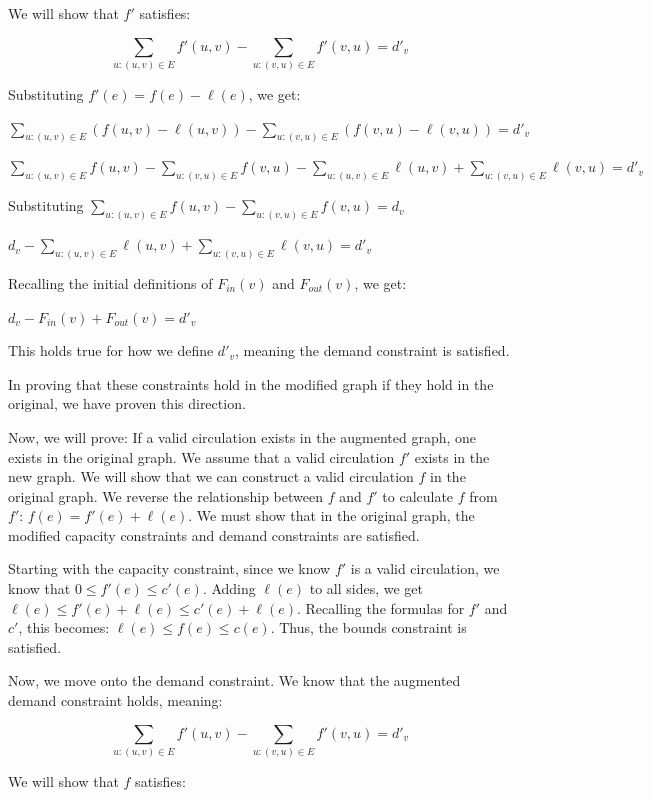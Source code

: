 \documentclass[11pt]{article}
\begin{document}
\begin{enumerate}
We will show that $f'$ satisfies:

$$\sum_{u: (u, v) \in E} f'(u, v) - \sum_{u: (v, u) \in E} f'(v, u) = d'_v$$

Substituting $f'(e) = f(e) - \ell(e)$, we get:

$\sum_{u: (u, v) \in E} (f(u, v) - \ell(u, v)) - \sum_{u: (v, u) \in E} (f(v, u) - \ell(v, u)) = d'_v$

$\sum_{u: (u, v) \in E} f(u, v) - \sum_{u: (v, u) \in E} f(v, u) - \sum_{u: (u, v) \in E} \ell(u, v) + \sum_{u: (v, u) \in E} \ell(v, u) = d'_v$

Substituting $\sum_{u: (u, v) \in E} f(u, v) - \sum_{u: (v, u) \in E} f(v, u) = d_v$

$d_v - \sum_{u: (u, v) \in E} \ell(u, v) + \sum_{u: (v, u) \in E} \ell(v, u) = d'_v$

Recalling the initial definitions of $F_{in}(v)$ and $F_{out}(v)$, we get:

$d_v - F_{in}(v) + F_{out}(v) = d'_v$

This holds true for how we define $d'_v$, meaning the demand constraint is satisfied.

In proving that these constraints hold in the modified graph if they hold in the original, we have proven this direction.

\medbreak

Now, we will prove: If a valid circulation exists in the augmented graph, one exists in the original graph.
We assume that a valid circulation $f'$ exists in the new graph. We will show that we can construct a valid circulation $f$ in the original graph. 
We reverse the relationship between $f$ and $f'$ to calculate $f$ from $f'$: $f(e) = f'(e) + \ell(e)$. 
We must show that in the original graph, the modified capacity constraints and demand constraints are satisfied.

Starting with the capacity constraint, since we know $f'$ is a valid circulation, we know that $0 \leq f'(e) \leq c'(e)$. 
Adding $\ell(e)$ to all sides, we get $\ell(e) \leq f'(e) + \ell(e) \leq c'(e) + \ell(e)$. Recalling the formulas for $f'$ and $c'$, this becomes: 
$\ell(e) \leq f(e) \leq c(e)$. Thus, the bounds constraint is satisfied.

Now, we move onto the demand constraint. We know that the augmented demand constraint holds, meaning:

$$\sum_{u: (u, v) \in E} f'(u, v) - \sum_{u: (v, u) \in E} f'(v, u) = d'_v$$

We will show that $f$ satisfies:


\end{enumerate}
\end{document}
